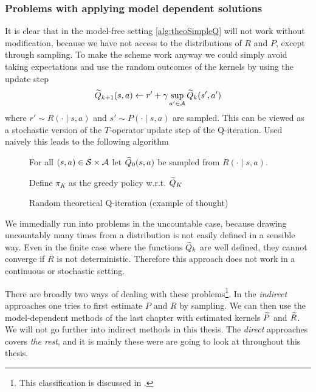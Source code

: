 \subsubsection{Problems with applying model dependent solutions}

It is clear that in the model-free setting
\cref{alg:theoSimpleQ} will not work without
modification, because we have not access to the distributions
of $R$ and $P$, except through sampling.
To make the scheme work anyway we could simply avoid taking expectations
and use the random outcomes of the kernels
by using the update step
\[ \widetilde{Q}_{k+1}(s, a) \leftarrow
r' + \gamma \sup_{a' \in \mathcal{A}} \widetilde{Q}_k(s', a') \]
where $r' \sim R(\cdot \mid s, a)$ and $s' \sim P(\cdot \mid s, a)$ are
sampled.
This can be viewed as a stochastic version of the $T$-operator
update step of the Q-iteration.
Used naively this leads to the following algorithm

\begin{figure}[H]
\begin{algorithm}[H] %
  \caption{Random theoretical Q-iteration (example of thought)}
For all $(s, a) \in \mathcal{S} \times \mathcal{A}$ let
$\widetilde{Q}_0(s, a)$ be sampled from $R(\cdot \mid s, a)$.

Define $\pi_K$ as the greedy policy w.r.t. $\widetilde{Q}_K$ \\
\label{alg:theoRandomQ}
\end{algorithm}
\end{figure}
We immedially run into problems in the uncountable case, because
drawing uncountably many times from a distribution is not easily
defined in a sensible way.
Even in the finite case where the functions $\widetilde{Q}_k$
are well defined, they cannot converge if $R$ is not deterministic.
Therefore this approach does not work in a continuous or
stochastic setting.

There are broadly two ways of dealing with these
problems\footnote{This classification is discussed in .}.
In the \emph{indirect} approaches one tries to first estimate $P$ and $R$
by sampling.
We can then use the model-dependent methods of the last chapter with
estimated kernels $\widetilde{P}$ and $\widetilde{R}$.
We will not go further into indirect methods in this thesis.
The \emph{direct} approaches covers \emph{the rest},
and it is mainly these were are going to look at throughout this
thesis.


